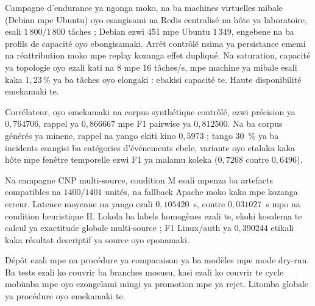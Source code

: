 Campagne d'endurance ya ngonga moko, na ba machines virtuelles mibale
(Debian mpe Ubuntu) oyo esangisami na Redis centralisé na hôte ya
laboratoire, esali $1\,800/1\,800$ tâches ; Debian ezwi 451 mpe Ubuntu
$1\,349$, engebene na ba profils de capacité oyo ebongisamaki. Arrêt
contrôlé nsima ya persistance ememi na réattribution moko mpe replay
kozanga effet dupliqué. Na saturation, capacité ya topologie oyo ezali
kati na 8 mpe 16 tâches/s, mpe machine ya mibale esali kaka
$1{,}23\,\%$ ya ba tâches oyo elongaki : ebakisi capacité te. Haute
disponibilité emekamaki te.

Corrélateur, oyo emekamaki na corpus synthétique contrôlé, ezwi précision
ya $0{,}764706$, rappel ya $0{,}866667$ mpe F1 pairwise ya
$0{,}812500$. Na ba corpus générés ya minene, rappel na yango ekiti kino
$0{,}5973$ ; tango 30~\% ya ba incidents esangisi ba catégories
d'événements ebele, variante oyo etalaka kaka hôte mpe fenêtre temporelle
ezwi F1 ya malamu koleka ($0{,}7268$ contre $0{,}6496$).

Na campagne CNP multi-source, condition M esali mpenza ba
artefacts compatibles na $1400/1401$ unités, na fallback Apache moko
kaka mpe kozanga erreur. Latence moyenne na yango ezali
$0{,}105420$~s, contre $0{,}031027$~s mpo na condition heuristique H.
Lokola ba labels homogènes ezali te, ekoki kosalema te calcul ya
exactitude globale multi-source ; F1 Linux/auth ya $0{,}390244$ etikali
kaka résultat descriptif ya source oyo eponamaki.

Dépôt ezali mpe na procédure ya comparaison ya ba modèles mpe mode
dry-run. Ba tests ezali ko couvrir ba branches mosusu, kasi ezali ko
couvrir te cycle mobimba mpe oyo ezongelami mingi ya promotion mpe ya
rejet. Litomba globale ya procédure oyo emekamaki te.

